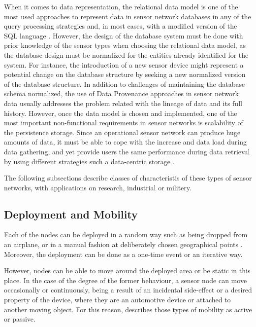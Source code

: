 When it comes to data representation, the relational data model
\cite{relational-model} is one of the most used approaches to represent data
in sensor network databases in any of the query processing strategies and, in
most cases, with a modified version of the SQL language \cite{sn-db-newop}.
However, the design of the database system must be done with prior knowledge
of the sensor types when choosing the relational data model, as the database
design must be normalized \cite{db-normalization} for the entities already
identified for the system. For instance, the introduction of a new sensor
device might represent a potential change on the database structure by seeking
a new normalized version of the database structure. In addition to challenges
of maintaining the database schema normalized, the use of Data Provenance
approaches in sensor network data \cite{sn-provenance} usually addresses the
problem related with the lineage of data  and its full history. However, once
the data model is chosen and implemented, one of the most important
non-functional requirements in sensor networks is scalability of the
persistence storage. Since an operational sensor network can produce huge
amounts of data, it must be able to cope with the increase and data load
during data gathering, and yet provide users the same performance during data
retrieval by using different strategies such a data-centric storage
\cite{sn-storage03}.

The following subsections describe classes of characteristis of these types of
sensor networks, with applications on research, industrial or militery.

\subsection{Deployment and Mobility}

Each of the nodes can be deployed in a random way such as being dropped
from an airplane, or in a manual fashion at deliberately chosen geographical 
points \cite{sn-intro01}. Moreover, the deployment can be done as a one-time
event or an iterative way. 

However, nodes can be able to move around the deployed area or be static in
this place. In the case of the degree of the former behaviour, a sensor node
can move occasionally or continuously, being a result of an incidental 
side-effect or a desired property of the device, where they are an automotive
device or attached to another moving object. For this reason, \cite{sn-intro01} 
describes those types of mobility as active or passive.

